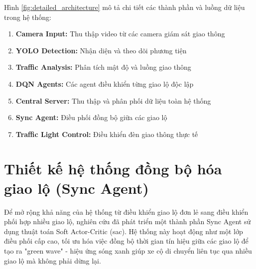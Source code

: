 Hình \ref{fig:detailed_architecture} mô tả chi tiết các thành phần và luồng dữ liệu
trong hệ thống:

\begin{enumerate}
    \item \textbf{Camera Input:} Thu thập video từ các camera giám sát giao thông
    \item \textbf{YOLO Detection:} Nhận diện và theo dõi phương tiện
    \item \textbf{Traffic Analysis:} Phân tích mật độ và luồng giao thông
    \item \textbf{DQN Agents:} Các agent điều khiển từng giao lộ độc lập
    \item \textbf{Central Server:} Thu thập và phân phối dữ liệu toàn hệ thống
    \item \textbf{Sync Agent:} Điều phối đồng bộ giữa các giao lộ
    \item \textbf{Traffic Light Control:} Điều khiển đèn giao thông thực tế
\end{enumerate}




\section{Thiết kế hệ thống đồng bộ hóa giao lộ (Sync Agent)}

Để mở rộng khả năng của hệ thống từ điều khiển giao lộ đơn lẻ sang điều khiển phối hợp nhiều giao lộ, nghiên cứu đã phát triển một thành phần Sync Agent sử dụng thuật toán Soft Actor-Critic (\ac{sac}). Hệ thống này hoạt động như một lớp điều phối cấp cao, tối ưu hóa việc đồng bộ thời gian tín hiệu giữa các giao lộ để tạo
ra "green wave" - hiệu ứng sóng xanh giúp xe cộ di chuyển liên tục qua nhiều giao lộ mà không phải dừng lại.

